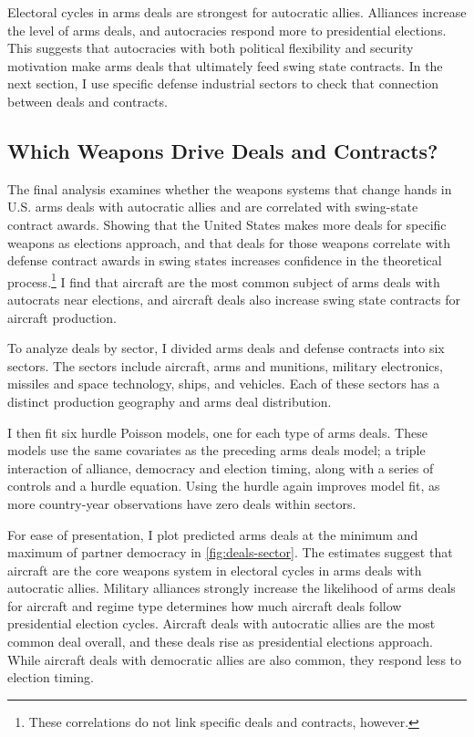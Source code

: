 \documentclass[12pt]{article}
\begin{document}
Electoral cycles in arms deals are strongest for autocratic allies. 
Alliances increase the level of arms deals, and autocracies respond more to presidential elections. 
This suggests that autocracies with both political flexibility and security motivation make arms deals that ultimately feed swing state contracts. 
In the next section, I use specific defense industrial sectors to check that connection between deals and contracts. 



\subsection{Which Weapons Drive Deals and Contracts?} 


The final analysis examines whether the weapons systems that change hands in U.S. arms deals with autocratic allies and are correlated with swing-state contract awards. 
Showing that the United States makes more deals for specific weapons as elections approach, and that deals for those weapons correlate with defense contract awards in swing states increases confidence in the theoretical process.\footnote{These correlations do not link specific deals and contracts, however.}
I find that aircraft are the most common subject of arms deals with autocrats near elections, and aircraft deals also increase swing state contracts for aircraft production.


To analyze deals by sector, I divided arms deals and defense contracts into six sectors. 
The sectors include aircraft, arms and munitions, military electronics, missiles and space technology, ships, and vehicles.  
Each of these sectors has a distinct production geography and arms deal distribution.


I then fit six hurdle Poisson models, one for each type of arms deals. 
These models use the same covariates as the preceding arms deals model; a triple interaction of alliance, democracy and election timing, along with a series of controls and a hurdle equation.
Using the hurdle again improves model fit, as more country-year observations have zero deals within sectors. 


For ease of presentation, I plot predicted arms deals at the minimum and maximum of partner democracy in \autoref{fig:deals-sector}.
The estimates suggest that aircraft are the core weapons system in electoral cycles in arms deals with autocratic allies. 
Military alliances strongly increase the likelihood of arms deals for aircraft and regime type determines how much aircraft deals follow presidential election cycles. 
Aircraft deals with autocratic allies are the most common deal overall, and these deals rise as presidential elections approach. 
While aircraft deals with democratic allies are also common, they respond less to election timing. 
\end{document}
